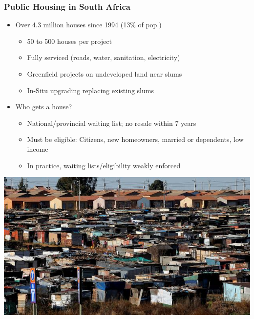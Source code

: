 \documentclass[aspectratio=149]{beamer}
\begin{document}

\begin{frame}
\frametitle{Public Housing in South Africa}
  \begin{itemize}
      \item Over 4.3 million houses since 1994 (13\% of pop.)
      \begin{itemize}
        \item 50 to 500 houses per project
        \item Fully serviced (roads, water, sanitation, electricity)
        \item Greenfield projects on undeveloped land near slums
        \item In-Situ upgrading replacing existing slums
      \end{itemize}
    \vspace{.1cm}
    \item Who gets a house?
      \begin{itemize}
        \item National/provincial waiting list; no resale within 7 years
        \item Must be eligible: Citizens, new homeowners, married or dependents, low income
        \item In practice, waiting lists/eligibility weakly enforced
      \end{itemize}
  \end{itemize}


\begin{center}
\includegraphics[scale=1]{slum_rdp.jpeg}
\end{center}

\end{frame}
\end{document}
